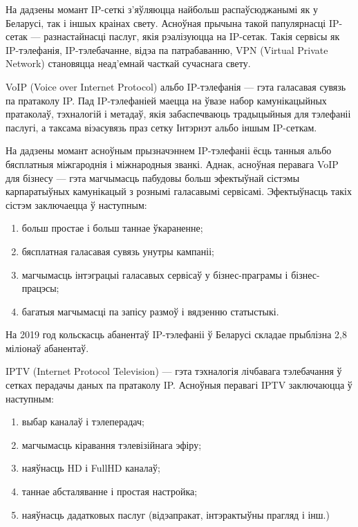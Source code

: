\sectionWithoutNumber{\prefacename}

На дадзены момант IP-сеткі з'яўляюцца найбольш распаўсюджанымі як
у Беларусі, так і іншых краінах свету. Асноўная прычына такой
папулярнасці IP-сетак --- разнастайнасці паслуг, якія рэалізуюцца
на IP-сетак. Такія сервісы як IP-тэлефанія, IP-тэлебачанне, відэа
па патрабаванню, VPN (Virtual Private Network) становяцца
неад'емнай часткай сучаснага свету.

VoIP (Voice over Internet Protocol) альбо IP-тэлефанія --- гэта
галасавая сувязь па пратаколу IP. Пад IP-тэлефаніей маецца на ўвазе
набор камунікацыйных пратаколаў, тэхналогій і метадаў, якія
забаспечваюць традыцыйныя для тэлефаніі паслугі, а таксама віэасувязь
праз сетку Інтэрнэт альбо іншым IP-сеткам.

На дадзены момант асноўным прызначэннем IP-тэлефаніі ёсць танныя альбо
бяс\-плат\-ныя міжгароднія і міжнародныя званкі. Аднак, асноўная перавага
VoIP для бізнесу --- гэта магчымасць пабудовы больш эфектыўнай сістэмы
карпаратыўных камунікацый з рознымі галасавымі сервісамі.
Эфектыўнасць такіх сістэм заключаецца ў наступным:
\begin{enumerate}
    \item больш простае і больш таннае ўкараненне;
    \item бясплатная галасавая сувязь унутры кампаніі;
    \item магчымасць інтэграцыі галасавых сервісаў у
          бізнес-праграмы і бізнес-працэсы;
    \item багатыя магчымасці па запісу размоў і вядзенню статыстыкі.
\end{enumerate}

На 2019 год кольскасць абанентаў IP-тэлефаніі ў Беларусі складае
прыблізна 2,8 мі\-ліонаў абанентаў.

IPTV (Internet Protocol Television) --- гэта тэхналогія лічбавага
тэлебачання ў сетках перадачы даных па пратаколу IP.
Асноўныя перавагі IPTV заключаюцца ў наступным:
\begin{enumerate}
    \item выбар каналаў і тэлеперадач;
    \item магчымасць кіравання тэлевізійнага эфіру;
    \item наяўнасць HD і FullHD каналаў;
    \item таннае абсталяванне і простая настройка;
    \item наяўнасць дадатковых паслуг (відэапракат, інтэрактыўны прагляд
          і інш.)
\end{enumerate}

